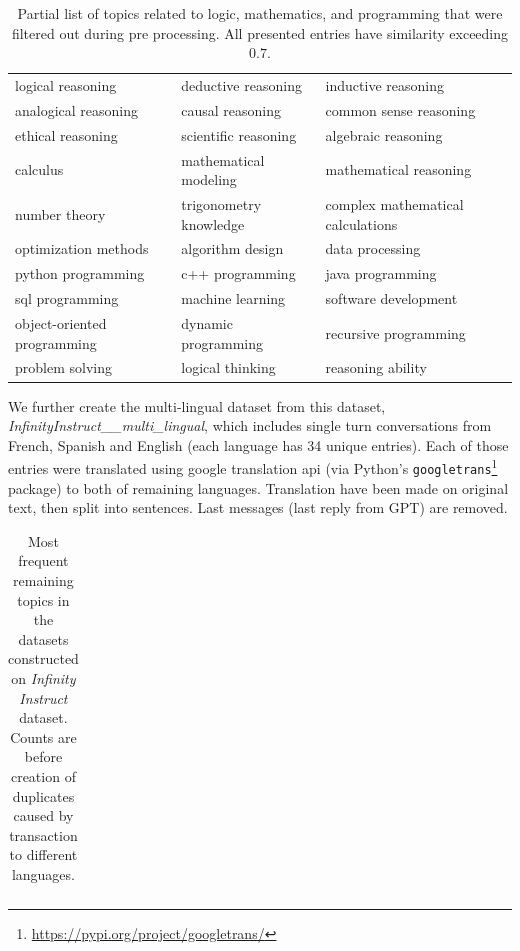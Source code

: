 \begin{appendices}
    \begin{table}[t!]
    \centering
    \caption{Partial list of topics related to logic, mathematics, and programming that were filtered out during pre processing. All presented entries have similarity exceeding $0.7$.}
    \begin{tabular}{|l|l|l|}
    \hline
    logical reasoning & deductive reasoning & inductive reasoning \\
    analogical reasoning & causal reasoning & common sense reasoning \\
    ethical reasoning & scientific reasoning & algebraic reasoning \\
    calculus & mathematical modeling & mathematical reasoning \\
    number theory & trigonometry knowledge & complex mathematical calculations \\
    optimization methods & algorithm design & data processing \\
    python programming & c++ programming & java programming \\
    sql programming & machine learning & software development \\
    object-oriented programming & dynamic programming & recursive programming \\
    problem solving & logical thinking & reasoning ability \\
    \hline
    \end{tabular}
    \label{tab:experiments__datasets__infinity_instruct__filtered_labels}
    \end{table}

    \noindent We further create the multi-lingual dataset from this dataset, \textit{InfinityInstruct\_\_multi\_lingual}, which includes single turn conversations from French, Spanish and English (each language has 34 unique entries). Each of those entries were translated using google translation api (via Python's \texttt{googletrans}\footnote{\url{https://pypi.org/project/googletrans/}} package) to both of remaining languages. Translation have been made on original text, then split into sentences. Last messages (last reply from GPT) are removed.

    \begin{table}[t!]
    \centering
    \caption{Most frequent remaining topics in the datasets constructed on \textit{Infinity Instruct} dataset. Counts are before creation of duplicates caused by transaction to different languages.}

    \centering
    \begin{tabular}{p{6cm} p{1cm}}
    \toprule


\end{tabular}
\end{table}
\end{appendices}
